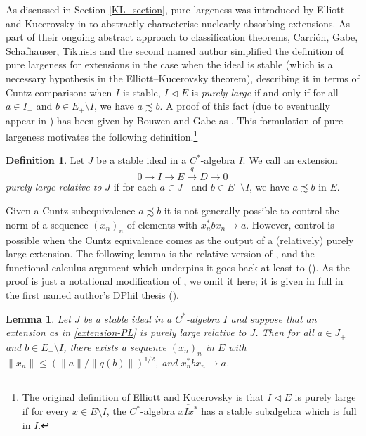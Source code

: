 \documentclass[reqno]{amsart}
\newtheorem{lem}[thm]{Lemma}
\theoremstyle{definition}
\newtheorem{defn}[thm]{Definition}
\theoremstyle{remark}
\numberwithin{equation}{section}
\theoremstyle{definition}
\begin{document}
As discussed in Section \ref{KL_section}, pure largeness was introduced by Elliott and Kucerovsky in \cite{EK.PJM} to abstractly characterise nuclearly absorbing extensions. As part of their ongoing abstract approach to classification theorems, Carri\'on, Gabe, Schafhauser, Tikuisis and the second named author simplified the definition of pure largeness for extensions in the case when the ideal is stable (which is a necessary hypothesis in the Elliott--Kucerovsky theorem), describing it in terms of Cuntz comparison: when $I$ is stable, $I\lhd E$ is \emph{purely large} if and only if for all $a\in I_+$ and $b\in E_+\setminus I$, we have $a\precsim b$. A proof of this fact (due to eventually appear in \cite{CGSTW2}) has been given by Bouwen and Gabe as \cite[Proposition 4.14]{Bouwen-Gabe-2024}.  This formulation of pure largeness motivates the following definition.\footnote{The original definition of Elliott and Kucerovsky is that $I\lhd E$ is purely large if for every $x\in E\setminus I$, the $C^*$-algebra $\overline{xIx^*}$ has a stable subalgebra which is full in $I$.} 

\begin{defn} 
\label{defn_PL}  
Let $J$ be a stable ideal in a $C^*$-algebra $I$. We call an extension 
\begin{equation} \label{extension-PL} 
0\longrightarrow I \stackrel{}{\longrightarrow} E\stackrel{q}{\longrightarrow} D \longrightarrow 0 
\end{equation} 
 \textit{purely large relative to} $J$ if for each $a\in J_{+}$ and $b\in E_{+} \setminus I$, we have $a\precsim b$ in $E$. 
\end{defn} 

Given a Cuntz subequivalence $a\precsim b$ it is not generally possible to control the norm of a sequence $(x_n)_{n}$ of elements with $x_n^*bx_n\to a$. However, control is possible when the Cuntz equivalence comes as the output of a (relatively) purely large extension. The following lemma is the relative version of \cite[Proposition 4.10]{Bouwen-Gabe-2024}, and the functional calculus argument which underpins it goes back at least to (\cite[Lemma 7]{EK.PJM}). As the proof is just a notational modification of \cite[Proposition 4.10]{Bouwen-Gabe-2024}, we omit it here; it is given in full in the first named author's DPhil thesis (\cite[Lemma 5.1.2]{Hua_thesis}).

\begin{lem}  \label{relative_purely_large_equi}
Let $J$ be a stable ideal in a $C^*$-algebra $I$ and suppose that an extension as in \eqref{extension-PL} is purely large relative to $J$.  Then for all $a\in J_+$ and $b\in E_+\setminus I$, there exists a sequence $(x_n)_n$ in $E$ with $\|x_n\|\leq (\|a\|/\|q(b)\|)^{1/2}$, and $x_n^*bx_n\to a$.
\end{lem} 
\end{document}
